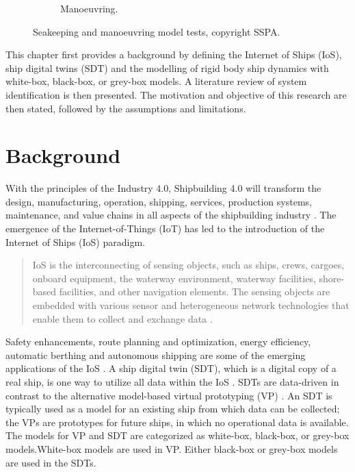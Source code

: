 \begin{figure}
\begin{subfigure}[b]{0.45\textwidth}
         \caption{Manoeuvring.}
         \label{fig:manoeuvring}
     \end{subfigure}
     \hfill
    \caption{Seakeeping and manoeuvring model tests, copyright SSPA.}
    \label{fig:seakeeping_and_manoeuvring}

\end{figure}
This chapter first provides a background by defining the Internet of Ships (IoS), ship digital twins (SDT) and the modelling of rigid body ship dynamics with white-box, black-box, or grey-box models. A literature review of system identification is then presented.
The motivation and objective of this research are then stated, followed by the assumptions and limitations.



\section{Background}
With the principles of the Industry 4.0, Shipbuilding 4.0 will transform the design, manufacturing, operation, shipping, services, production systems, maintenance, and value chains in all aspects of the shipbuilding 
industry \cite{stanic_toward_2018}.
The emergence of the Internet-of-Things (IoT) has led to the introduction of the Internet of Ships (IoS) paradigm. 
\begin{quote} 
\vspace{0.1cm}
IoS is the interconnecting of sensing objects, such as ships, crews, cargoes, onboard equipment, the waterway environment, waterway facilities, shore-based facilities, and other navigation elements. The sensing objects are embedded with various sensor and heterogeneous network technologies that enable them to collect and exchange data \cite{liu_internet_2016-1}.
\vspace{0.1cm}
\end{quote}
Safety enhancements, route planning and optimization, energy efficiency, automatic berthing and autonomous shipping are some of the emerging applications of the IoS \cite{aslam_internet_2020}.
A ship digital twin (SDT), which is a digital copy of a real ship, is one way to utilize all data within the IoS \cite{chen_review_2021}. 
SDTs are data-driven in contrast to the alternative model-based virtual prototyping (VP) \cite{major_framework_2021}. An SDT is typically used as a model for an existing ship from which data can be collected; the VPs are  prototypes for future ships, in which no operational data is available.
The models for VP and SDT are categorized as white-box, black-box, or grey-box models.White-box models are used in VP. Either black-box or grey-box models are used in the SDTs. 
